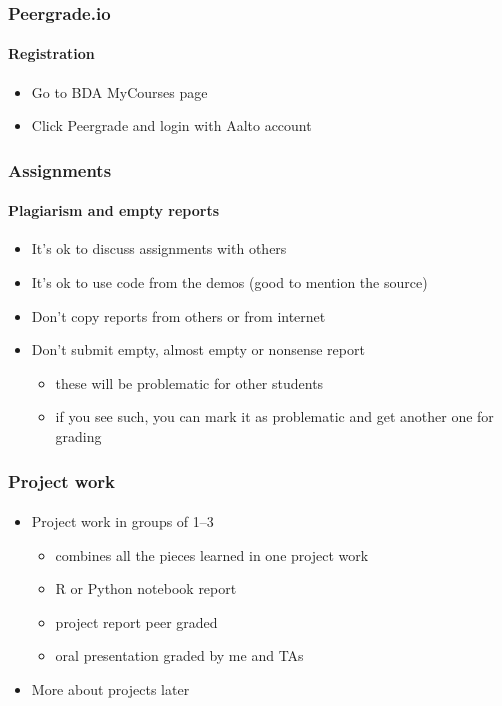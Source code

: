 \documentclass[english]{beamer}
\begin{document}
\begin{frame}
  \frametitle{Peergrade.io}  %
  \framesubtitle{Registration}
  \begin{itemize}
  \item Go to BDA MyCourses page
  \item Click Peergrade and login with Aalto account
  \end{itemize}
  
\end{frame}

\begin{frame}
  \frametitle{Assignments}  %
  \framesubtitle{Plagiarism and empty reports}
  \begin{itemize}
  \item It's ok to discuss assignments with others
  \item It's ok to use code from the demos (good to mention the source)
  \item Don't copy reports from others or from internet
  \item Don't submit empty, almost empty or nonsense report
    \begin{itemize}
    \item these will be problematic for other students
    \item if you see such, you can mark it as problematic and get
      another one for grading
    \end{itemize}
  \end{itemize}
  
\end{frame}


\begin{frame}
  \frametitle{Project work}  %
  \framesubtitle{}
  \begin{itemize}
  \item Project work in groups of 1--3
    \begin{itemize}
    \item combines all the pieces learned in one project work
    \item R or Python notebook report
    \item project report peer graded
    \item oral presentation graded by me and TAs
    \end{itemize}
  \item More about projects later
  \end{itemize}
  
\end{frame}
\end{document}
